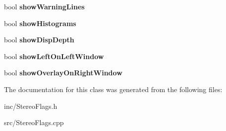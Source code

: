 \begin{DoxyCompactItemize}
\item 
bool {\bfseries show\+Warning\+Lines}\hypertarget{class_stereo_flags_a717a36e8c4c4b26171976b7c6060fea7}{}\label{class_stereo_flags_a717a36e8c4c4b26171976b7c6060fea7}

\item 
bool {\bfseries show\+Histograms}\hypertarget{class_stereo_flags_a0a0886c9621f2bdd666dbafb67b7985e}{}\label{class_stereo_flags_a0a0886c9621f2bdd666dbafb67b7985e}

\item 
bool {\bfseries show\+Disp\+Depth}\hypertarget{class_stereo_flags_aae4fe519a870ac2419e1e1ce57354fc2}{}\label{class_stereo_flags_aae4fe519a870ac2419e1e1ce57354fc2}

\item 
bool {\bfseries show\+Left\+On\+Left\+Window}\hypertarget{class_stereo_flags_a5341e3f1a0ae76976c63fed01e0df8a3}{}\label{class_stereo_flags_a5341e3f1a0ae76976c63fed01e0df8a3}

\item 
bool {\bfseries show\+Overlay\+On\+Right\+Window}\hypertarget{class_stereo_flags_a38516418eb582c7fc0f27319c4dbe817}{}\label{class_stereo_flags_a38516418eb582c7fc0f27319c4dbe817}

\end{DoxyCompactItemize}


The documentation for this class was generated from the following files\+:\begin{DoxyCompactItemize}
\item 
inc/Stereo\+Flags.\+h\item 
src/Stereo\+Flags.\+cpp\end{DoxyCompactItemize}
